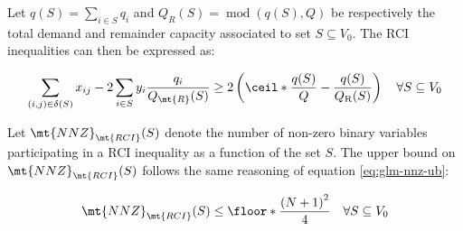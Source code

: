 Let $q(S) = \sum_{i \in S} q_i$ and $Q_{R}(S) = \mathop{mod}\left(q(S), Q \right)$ be respectively the total demand and remainder capacity associated to set $S \subseteq V_0$.
The RCI inequalities can then be expressed as:

\begin{equation}\label{eq:rci-inequality}
	\begin{split}
		\sum_{(i, j) \in \delta(S)} x_{ij} -2 \sum_{i \in S} y_i {\frac{q_i}{Q_\mt{R}(S)}}    \ge   2 \left( \ceil*{ \frac{q(S)}{Q}} - \frac{q(S)}{Q_{\mathrm{R}}(S)} \right) \quad \forall S \subseteq V_0
	\end{split}
\end{equation}

Let $\mt{NNZ}_{\mt{RCI}}(S)$ denote the number of non-zero binary variables participating in a RCI inequality as a function of the set $S$.
The upper bound on $\mt{NNZ}_{\mt{RCI}}(S)$ follows the same reasoning of equation \eqref{eq:glm-nnz-ub}:

\begin{equation}\label{eq:rc-nnz-ub}
	\mt{NNZ}_{\mt{RCI}}(S) \le \floor*{\frac{\left( N + 1\right)^2}{4}} \quad \forall S \subseteq V_0
\end{equation}
